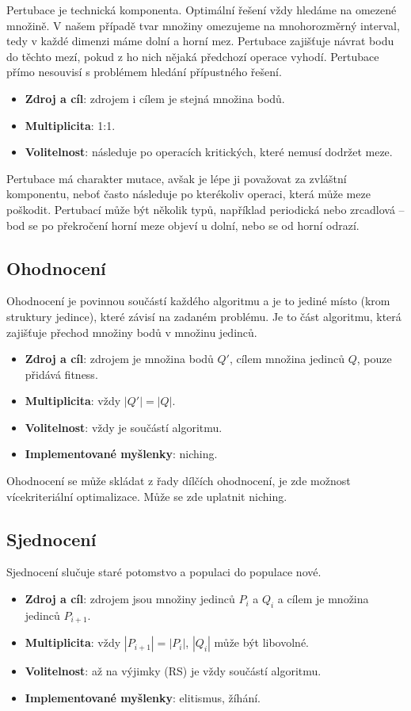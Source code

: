 Pertubace je technická komponenta. Optimální řešení vždy hledáme na omezené množině. V našem případě tvar množiny omezujeme na mnohorozměrný interval, tedy v každé dimenzi máme dolní a horní mez. Pertubace zajišťuje návrat bodu do těchto mezí, pokud z ho nich nějaká předchozí operace vyhodí. Pertubace přímo nesouvisí s problémem hledání přípustného řešení.
\begin{itemize}
  \item \textbf{Zdroj a cíl}: zdrojem i cílem je stejná množina bodů.
  \item \textbf{Multiplicita}:  1:1.
  \item \textbf{Volitelnost}: následuje po operacích kritických, které nemusí dodržet meze.
\end{itemize}

Pertubace má charakter mutace, avšak je lépe ji považovat za zvláštní komponentu, neboť často následuje po kterékoliv operaci, která může meze poškodit. Pertubací může být několik typů, například periodická nebo zrcadlová -- bod se po překročení horní meze objeví u dolní, nebo se od horní odrazí.


\subsection{Ohodnocení}

Ohodnocení je povinnou součástí každého algoritmu a je to jediné místo (krom struktury jedince), které závisí na zadaném problému. Je to část algoritmu, která zajišťuje přechod množiny bodů v množinu jedinců.
\begin{itemize}
  \item \textbf{Zdroj a cíl}: zdrojem je množina bodů $Q'$, cílem množina jedinců $Q$, pouze přidává fitness.
  \item \textbf{Multiplicita}: vždy $|Q'| = |Q|$.
  \item \textbf{Volitelnost}: vždy je součástí algoritmu.
  \item \textbf{Implementované myšlenky}: niching.
\end{itemize}

Ohodnocení se může skládat z řady dílčích ohodnocení, je zde možnost vícekriteriální optimalizace. Může se zde uplatnit niching.

\subsection{Sjednocení}

Sjednocení slučuje staré potomstvo a populaci do populace nové.
\begin{itemize}
  \item \textbf{Zdroj a cíl}: zdrojem jsou množiny jedinců $P_i$ a $Q_i$ a cílem je množina jedinců $P_{i+1}$.
  \item \textbf{Multiplicita}: vždy $|P_{i+1}| = |P_i|$, $|Q_i|$ může být libovolné.
  \item \textbf{Volitelnost}: až na výjimky (RS) je vždy součástí algoritmu.
  \item \textbf{Implementované myšlenky}: elitismus, žíhání.
\end{itemize}

